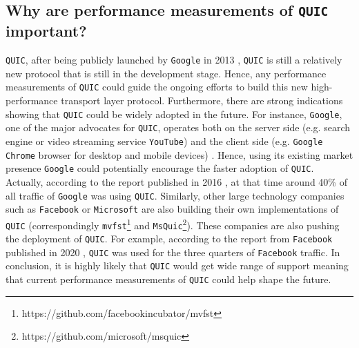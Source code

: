 \documentclass[12pt,a4paper,twoside,openright]{report}
\begin{document}
\subsection{Why are performance measurements of \texttt{QUIC} important?}

\texttt{QUIC}, after being publicly launched by \texttt{Google} in 2013 \cite{Chromium_Blog_Experimenting_with_quic}, \texttt{QUIC} is still a relatively new protocol that is still in the development stage.
Hence, any performance measurements of \texttt{QUIC} could guide the ongoing efforts to build this new high-performance transport layer protocol.
Furthermore, there are strong indications showing that \texttt{QUIC} could be widely adopted in the future.
For instance, \texttt{Google}, one of the major advocates for \texttt{QUIC}, operates both on the server side (e.g. search engine or video streaming service \texttt{YouTube}) and the client side (e.g. \texttt{Google Chrome} browser for desktop and mobile devices) \cite{A_QUICk_Introduction_to_HTTP3}.
Hence, using its existing market presence \texttt{Google} could potentially encourage the faster adoption of \texttt{QUIC}.
Actually, according to the report published in 2016 \cite{RuthJan2018AFLa}, at that time around 40\% of all traffic of \texttt{Google} was using \texttt{QUIC}.
Similarly, other large technology companies such as \texttt{Facebook} or \texttt{Microsoft} are also building their own implementations of \texttt{QUIC} (correspondingly \texttt{mvfst}\footnote{https://github.com/facebookincubator/mvfst} and \texttt{MsQuic}\footnote{https://github.com/microsoft/msquic}).
These companies are also pushing the deployment of \texttt{QUIC}. 
For example, according to the report from \texttt{Facebook} published in 2020 \cite{how-facebook-is-bringing-quic-to-billions}, \texttt{QUIC} was used for the three quarters of \texttt{Facebook} traffic. 
In conclusion, it is highly likely that \texttt{QUIC} would get wide range of support meaning that current performance measurements of \texttt{QUIC} could help shape the future.
\end{document}
